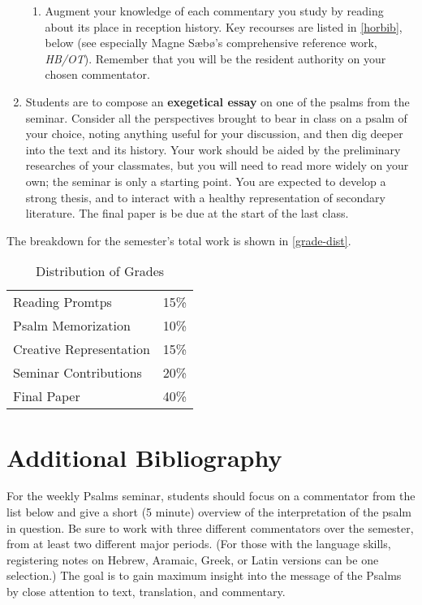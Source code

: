 \documentclass[titlepage]{article}
\newcommand\policy{../policy}
\begin{document}
\begin{enumerate}
\begin{enumerate}
		\item Augment your knowledge of each commentary you study by
		reading about its place in reception history. Key recourses are
		listed in \autoref{horbib}, below (see especially Magne Sæbø's
		comprehensive reference work, \emph{HB/OT}). Remember that you
		will be the resident authority on your chosen commentator.

	\end{enumerate}

	\item Students are to compose an \textbf{exegetical essay} on one of
	the psalms from the seminar. Consider all the perspectives brought
	to bear in class on a psalm of your choice, noting anything useful
	for your discussion, and then dig deeper into the text and its
	history. Your work should be aided by the preliminary researches of
	your classmates, but you will need to read more widely on your own;
	the seminar is only a starting point. You are expected to develop a
	strong thesis, and to interact with a healthy representation of
	secondary literature. The final paper is be due at the start of the
	last class.

\end{enumerate}

The breakdown for the semester's total work is shown in
\autoref{grade-dist}.

\begin{table}[htbp]
  \centering
  {\lining
  \begin{tabular}{lr}
    \toprule
    Reading Promtps         & 15\% \\
    Psalm Memorization      & 10\% \\
    Creative Representation & 15\% \\
    Seminar Contributions   & 20\% \\
    Final Paper             & 40\% \\
    \bottomrule
  \end{tabular}}
  \caption{Distribution of Grades}
  \label{grade-dist}
\end{table}




\section{Additional Bibliography}
\label{bibliography}

For the weekly Psalms seminar, students should focus on a commentator
from the list below and give a short (5 minute) overview of the
interpretation of the psalm in question. Be sure to work with three
different commentators over the semester, from at least two different
major periods. (For those with the language skills, registering notes on
Hebrew, Aramaic, Greek, or Latin versions can be one selection.) The
goal is to gain maximum insight into the message of the Psalms by close
attention to text, translation, and commentary.
\end{document}
